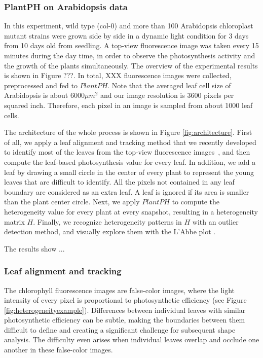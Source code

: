 \documentclass{bioinfo}
\begin{document}
\subsubsection{PlantPH on Arabidopsis data}

In this experiment, wild type (col-0) and more than 100 Arabidopsis chloroplast mutant strains were grown side by side in a dynamic light condition for 3 days from 10 days old from seedling. A top-view fluorescence image was taken every 15 minutes during the day time, in order to observe the photosynthesis activity and the growth of the plants simultaneously. The overview of the experimental results is shown in Figure ???. In total, XXX fluorescence images were collected, preprocessed and fed to $PlantPH$. Note that the averaged leaf cell size of Arabidopsis is about $6000 \mu m^2$ \citep{gegas2014endopolyploidy} and our image resolution is 3600 pixels per squared inch. Therefore, each pixel in an image is sampled from about 1000 leaf cells.

The architecture of the whole process is shown in Figure \ref{fig:architecture}. First of all, we apply a leaf alignment and tracking method that we recently developed to identify most of the leaves from the top-view fluorescence images~\citep{xi2014tracking,yin2014}, and then compute the leaf-based photosynthesis value for every leaf. In addition, we add a leaf by drawing a small circle in the center of every plant to represent the young leaves that are difficult to identify.
%
All the pixels not contained in any leaf boundary are considered as an extra leaf. A leaf is ignored if its area is smaller than the plant center circle.
%
Next, we apply $PlantPH$ to compute the heterogeneity value for every plant at every snapshot, resulting in a heterogeneity matrix $H$. Finally, we recognize heterogeneity patterns in $H$ with an outlier detection method, and visually explore them with the L'Abbe plot \citep{song1999exploring}.

The results show ...

\subsubsection{Leaf alignment and tracking}


The chlorophyll fluorescence images are false-color images, where the light intensity of every pixel is proportional to photosynthetic efficiency \citep{toet1996new} (see Figure \ref{fig:heterogeneityexample}). Differences between individual leaves with similar photosynthetic efficiency can be subtle, making the boundaries between them difficult to define and creating a significant challenge for subsequent shape analysis. The difficulty even arises when individual leaves overlap and occlude one another in these false-color images.
\end{document}
